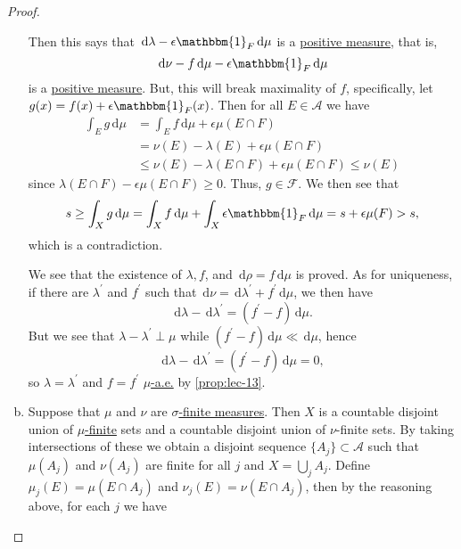 \begin{proof}
\begin{enumerate}[(a)]
\begin{explanation}
			      Then this says that \(\,\mathrm{d} \lambda - \epsilon \mathbbm{1}_{F} \,\mathrm{d} \mu\) is a \hyperref[def:signed-measure]{positive measure}, that is,
			      \[
				      \,\mathrm{d} \nu - f \,\mathrm{d} \mu - \epsilon \mathbbm{1}_{F} \,\mathrm{d} \mu
			      \]
			      is a \hyperref[def:signed-measure]{positive measure}. But, this will break maximality of \(f\), specifically, let \(g(x) = f(x) + \epsilon \mathbbm{1}_{F} (x)\). Then for all \(E \in \mathcal{A}\) we have
			      \[
				      \begin{split}
					      \int_E g \,\mathrm{d} \mu
					       & = \int_E f \,\mathrm{d} \mu + \epsilon\mu(E \cap F)                 \\
					       & = \nu(E) - \lambda(E) + \epsilon \mu(E \cap F)                      \\
					       & \leq \nu(E) - \lambda(E \cap F) + \epsilon\mu(E \cap F) \leq \nu(E)
				      \end{split}
			      \]
			      since \(\lambda(E \cap F) - \epsilon\mu(E \cap F) \geq 0\). Thus, \(g \in \mathscr{F}\). We then see that
			      \[
				      s \geq \int_X g \,\mathrm{d} \mu  = \int_X f \,\mathrm{d} \mu + \int_X \epsilon \mathbbm{1}_{F} \,\mathrm{d} \mu = s + \epsilon\mu(F) > s,
			      \]
			      which is a contradiction.
		      \end{explanation}
		      We see that the existence of \(\lambda , f\), and \(\,\mathrm{d} \rho = f \,\mathrm{d} \mu \) is proved. As for uniqueness, if there are \(\lambda ^\prime \) and \(f^\prime \) such that \(\,\mathrm{d} \nu = \,\mathrm{d} \lambda ^\prime + f^\prime \,\mathrm{d} \mu \), we then have
		      \[
			      \,\mathrm{d} \lambda - \,\mathrm{d} \lambda ^\prime = (f^\prime -f)\,\mathrm{d} \mu .
		      \]
		      But we see that \(\lambda -\lambda ^\prime \perp \mu \) while \((f^\prime -f)\,\mathrm{d} \mu \ll \,\mathrm{d} \mu \), hence
		      \[
			      \,\mathrm{d} \lambda -\,\mathrm{d} \lambda ^\prime = (f^\prime -f)\,\mathrm{d} \mu = 0,
		      \]
		      so \(\lambda = \lambda ^\prime \) and \(f = f^\prime \) \hyperref[def:mu-almost-everywhere]{\(\mu \)-a.e.} by \autoref{prop:lec-13}.
		\item Suppose that \(\mu \) and \(\nu \) are \hyperref[def:finite-signed-measure]{\(\sigma\)-finite measures}. Then \(X\) is a countable disjoint union of \hyperref[def:locally-finite]{\(\mu \)-finite} sets and a countable disjoint union of \(\nu \)-finite sets. By taking intersections of these we obtain a disjoint sequence \(\{A_j\}\subset \mathcal{A} \) such that \(\mu (A_{j} )\) and \(\nu (A_{j} )\) are finite for all \(j\) and \(X = \bigcup_{j} A_{j} \). Define \(\mu _{j} (E) = \mu (E \cap A_{j} )\) and \(\nu _{j} (E)= \nu (E \cap A_{j} )\), then by the reasoning above, for each \(j\) we have

\end{enumerate}
\end{proof}
